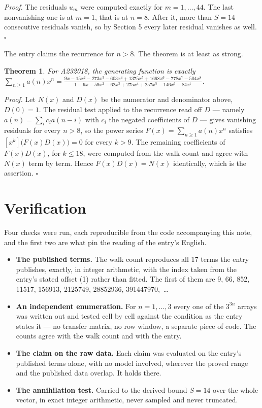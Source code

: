 \documentclass[11pt]{article}
\newtheorem{theorem}{Theorem}
\theoremstyle{definition}
\begin{document}
{\itshape Proof.} The residuals $u_m$ were computed exactly for $m = 1,\dots,44$. The last nonvanishing one is at $m = 1$, that is at $n = 8$. After it, more than $S = 14$ consecutive residuals vanish, so by Section 5 every later residual vanishes as well. $\square$

The entry claims the recurrence for $n > 8$. The theorem is at least as strong.

\begin{theorem} For A232018, the generating function is exactly $\sum_{n\ge 1} a(n)x^n = \frac{9x - 15x^{2} - 273x^{3} - 603x^{4} + 1375x^{5} + 1668x^{6} - 778x^{7} - 504x^{8}}{1 - 9x - 59x^{2} - 62x^{3} + 275x^{4} + 257x^{5} - 146x^{6} - 84x^{7}}$.\end{theorem}

{\itshape Proof.} Let $N(x)$ and $D(x)$ be the numerator and denominator above, $D(0)=1$. The residual test applied to the recurrence read off $D$ --- namely $a(n) = \sum_i c_i a(n-i)$ with $c_i$ the negated coefficients of $D$ --- gives vanishing residuals for every $n > 8$, so the power series $F(x)=\sum_{n\ge 1}a(n)x^n$ satisfies $[x^k]\bigl(F(x)D(x)\bigr) = 0$ for every $k > 9$. The remaining coefficients of $F(x)D(x)$, for $k \le 18$, were computed from the walk count and agree with $N(x)$ term by term. Hence $F(x)D(x) = N(x)$ identically, which is the assertion. $\square$

\section{Verification}

Four checks were run, each reproducible from the code accompanying this note, and the first two are what pin the reading of the entry's English.

\begin{itemize}

\item {\bfseries The published terms.} The walk count reproduces all 17 terms the entry publishes, exactly, in integer arithmetic, with the index taken from the entry's stated offset (1) rather than fitted. The first of them are 9, 66, 852, 11517, 156913, 2125749, 28852936, 391447970,~\dots

\item {\bfseries An independent enumeration.} For $n = 1,\dots,3$ every one of the $3^{3n}$ arrays was written out and tested cell by cell against the condition as the entry states it --- no transfer matrix, no row window, a separate piece of code. The counts agree with the walk count and with the entry.

\item {\bfseries The claim on the raw data.} Each claim was evaluated on the entry's published terms alone, with no model involved, wherever the proved range and the published data overlap. It holds there.

\item {\bfseries The annihilation test.} Carried to the derived bound $S = 14$ over the whole vector, in exact integer arithmetic, never sampled and never truncated.

\end{itemize}
\end{document}

